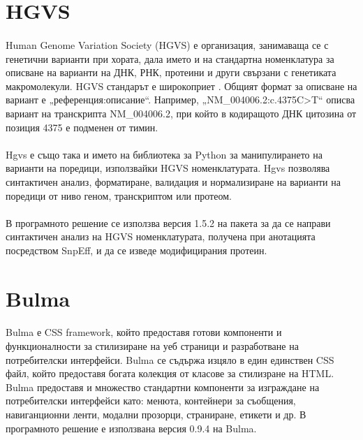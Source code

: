 \documentclass[pdftex,cyrillic,14pt,a4page,twoside,openright]{extreport}
\begin{document}
\section{HGVS}\label{sec:hgvs}
\paragraph{}
Human Genome Variation Society (HGVS) е организация, занимаваща се с генетични варианти при хората, дала името и на стандартна номенклатура за описване на варианти на ДНК, РНК, протеини и други свързани с генетиката макромолекули. HGVS стандарът е широкоприет \cite{dunnen2016}. Общият формат за описване на вариант е „референция:описание“. Например, „NM\_004006.2:c.4375C>T“ описва вариант на транскрипта NM\_004006.2, при който в кодиращото ДНК цитозина от позиция 4375 е подменен от тимин.

\paragraph{}
Hgvs \cite{wang2018} е също така и името на библиотека за Python за манипулирането на варианти на поредици, използвайки HGVS номенклатурата. Hgvs позволява синтактичен анализ, форматиране, валидация и нормализиране на варианти на поредици от ниво геном, транскриптом или протеом.

\paragraph{}
В програмното решение се използва версия 1.5.2 на пакета за да се направи синтактичен анализ на HGVS номенклатурата, получена при анотацията посредством SnpEff, и да се изведе модифицирания протеин.

\section{Bulma}
\paragraph{}
Bulma е CSS framework, който предоставя готови компоненти и функционалности за стилизиране на уеб страници и разработване на потребителски интерфейси. Bulma се съдържа изцяло в един единствен CSS файл, който предоставя богата колекция от класове за стилизране на HTML. Bulma предоставя и множество стандартни компоненти за изграждане на потребителски интерфейси като: менюта, контейнери за съобщения, навиганционни ленти, модални прозорци, страниране, етикети и др. В програмното решение е използвана версия 0.9.4 на Bulma.
\end{document}
